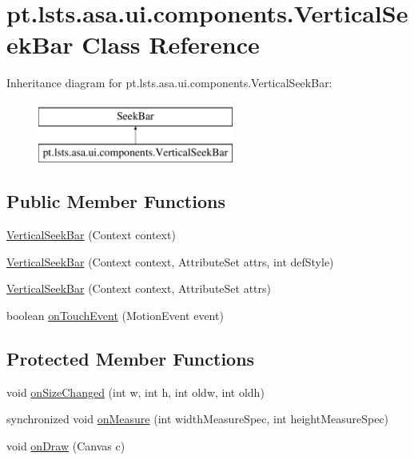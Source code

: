 \hypertarget{classpt_1_1lsts_1_1asa_1_1ui_1_1components_1_1VerticalSeekBar}{}\section{pt.\+lsts.\+asa.\+ui.\+components.\+Vertical\+Seek\+Bar Class Reference}
\label{classpt_1_1lsts_1_1asa_1_1ui_1_1components_1_1VerticalSeekBar}
Inheritance diagram for pt.\+lsts.\+asa.\+ui.\+components.\+Vertical\+Seek\+Bar\+:\begin{figure}[H]
\begin{center}
\leavevmode
\includegraphics[height=2.000000cm]{classpt_1_1lsts_1_1asa_1_1ui_1_1components_1_1VerticalSeekBar}
\end{center}
\end{figure}
\subsection*{Public Member Functions}
\begin{DoxyCompactItemize}
\item 
\hyperlink{classpt_1_1lsts_1_1asa_1_1ui_1_1components_1_1VerticalSeekBar_a45b188523a9596db861ae1078ec7e338}{Vertical\+Seek\+Bar} (Context context)
\item 
\hyperlink{classpt_1_1lsts_1_1asa_1_1ui_1_1components_1_1VerticalSeekBar_ac7a137d704ef72829e29eb4c72519821}{Vertical\+Seek\+Bar} (Context context, Attribute\+Set attrs, int def\+Style)
\item 
\hyperlink{classpt_1_1lsts_1_1asa_1_1ui_1_1components_1_1VerticalSeekBar_af07378c05a0cb172e12d9a619ab213cc}{Vertical\+Seek\+Bar} (Context context, Attribute\+Set attrs)
\item 
boolean \hyperlink{classpt_1_1lsts_1_1asa_1_1ui_1_1components_1_1VerticalSeekBar_a340f7db56e4d98e5606b916b946feb8a}{on\+Touch\+Event} (Motion\+Event event)
\end{DoxyCompactItemize}
\subsection*{Protected Member Functions}
\begin{DoxyCompactItemize}
\item 
void \hyperlink{classpt_1_1lsts_1_1asa_1_1ui_1_1components_1_1VerticalSeekBar_afd9f4bc25bd3faf4c1c0ffa0e22f9120}{on\+Size\+Changed} (int w, int h, int oldw, int oldh)
\item 
synchronized void \hyperlink{classpt_1_1lsts_1_1asa_1_1ui_1_1components_1_1VerticalSeekBar_a18cf118e6d0203cc6b757aa889959fd6}{on\+Measure} (int width\+Measure\+Spec, int height\+Measure\+Spec)
\item 
void \hyperlink{classpt_1_1lsts_1_1asa_1_1ui_1_1components_1_1VerticalSeekBar_a1c5a14b57fb5ad3ea24172faef7e7529}{on\+Draw} (Canvas c)
\end{DoxyCompactItemize}


